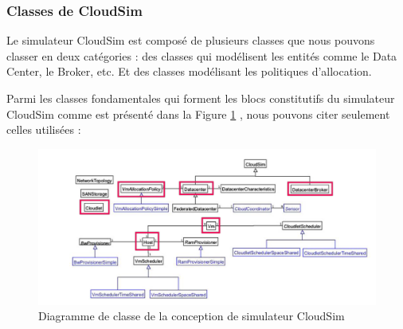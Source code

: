 \subsubsection{Classes de CloudSim}

\begin{onehalfspace}
Le simulateur CloudSim est composé de plusieurs classes que nous pouvons classer en deux catégories : des classes qui modélisent les entités comme le Data Center, le Broker, etc. Et des classes modélisant les politiques d'allocation.

Parmi les classes fondamentales qui forment les blocs constitutifs du simulateur CloudSim comme est présenté dans la Figure \ref{ClassCloudSim} , nous pouvons citer seulement celles utilisées :
\begin{figure}[!h]
\begin{center}
\includegraphics[scale=0.52]{figures/cloudsimclass.png} 
\end{center}
\caption{Diagramme de classe de la conception de simulateur CloudSim}
\label{ClassCloudSim}
\end{figure}
 

\end{onehalfspace}
